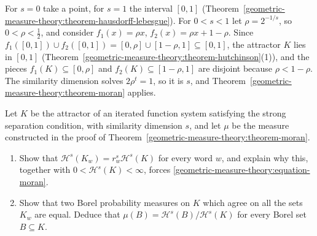 \begin{solution}
For $s = 0$ take a point, for $s = 1$ the interval $[0, 1]$ (Theorem~\ref{geometric-measure-theory:theorem-hausdorff-lebesgue}). For $0 < s < 1$ let $\rho = 2^{-1/s}$, so $0 < \rho < \frac12$, and consider
$f_1(x) = \rho x$, $f_2(x) = \rho x + 1 - \rho$. Since $f_1([0, 1]) \cup f_2([0, 1]) = [0, \rho] \cup [1 - \rho, 1] \subseteq [0, 1]$, the attractor $K$ lies in $[0, 1]$
(Theorem~\ref{geometric-measure-theory:theorem-hutchinson}(1)), and the pieces $f_1(K) \subseteq [0, \rho]$ and $f_2(K) \subseteq [1 - \rho, 1]$ are disjoint because $\rho < 1 - \rho$. The similarity dimension solves
$2\rho^t = 1$, so it is $s$, and Theorem~\ref{geometric-measure-theory:theorem-moran} applies.
\end{solution}

\begin{exercise}\label{geometric-measure-theory:exercise-natural-measure}
Let $K$ be the attractor of an iterated function system satisfying the strong separation condition, with similarity dimension $s$, and let $\mu$ be the measure constructed in the proof of
Theorem~\ref{geometric-measure-theory:theorem-moran}.
\begin{enumerate}
\item Show that $\mathcal{H}^s(K_w) = r_w^s\mathcal{H}^s(K)$ for every word $w$, and explain why this, together with $0 < \mathcal{H}^s(K) < \infty$, forces \eqref{geometric-measure-theory:equation-moran}.
\item Show that two Borel probability measures on $K$ which agree on all the sets $K_w$ are equal. Deduce that $\mu(B) = \mathcal{H}^s(B)/\mathcal{H}^s(K)$ for every Borel set $B \subseteq K$.
\end{enumerate}
\end{exercise}

